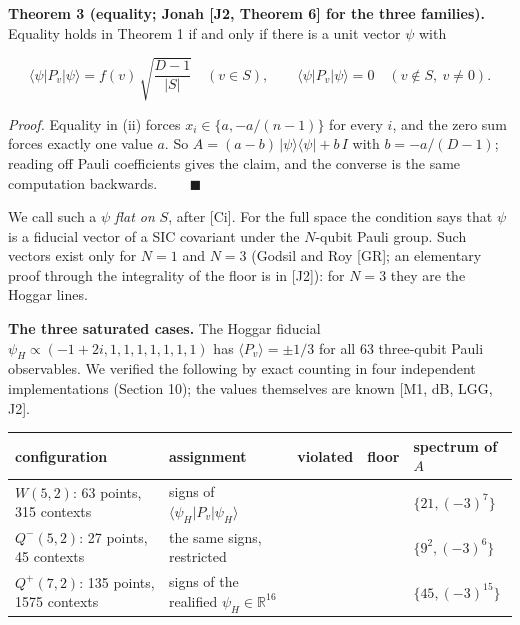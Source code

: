 \documentclass[11pt,a4paper]{article}
\begin{document}
\textbf{Theorem 3 (equality; Jonah {[}J2, Theorem 6{]} for the three families).} Equality holds in Theorem 1 if
and only if there is a unit vector \(\psi\) with

\[\langle \psi | P_v | \psi \rangle = f(v)\,\sqrt{\frac{D-1}{|S|}} \quad (v \in S), \qquad
\langle \psi | P_v | \psi \rangle = 0 \quad (v \notin S,\ v \ne 0).\]

\emph{Proof.} Equality in (ii) forces \(x_i \in \{a, -a/(n-1)\}\) for every \(i\), and the zero sum forces exactly
one value \(a\). So \(A = (a-b)\,|\psi\rangle\langle\psi| + b\,I\) with \(b = -a/(D-1)\); reading off Pauli
coefficients gives the claim, and the converse is the same computation backwards. \(\qquad\blacksquare\)

We call such a \(\psi\) \emph{flat on} \(S\), after {[}Ci{]}. For the full space the condition says that \(\psi\) is a
fiducial vector of a SIC covariant under the \(N\)-qubit Pauli group. Such vectors exist only for \(N = 1\)
and \(N = 3\) (Godsil and Roy {[}GR{]}; an elementary proof through the integrality of the floor is in {[}J2{]}):
for \(N = 3\) they are the Hoggar lines.

\textbf{The three saturated cases.} The Hoggar fiducial \(\psi_H \propto (-1+2i, 1, 1, 1, 1, 1, 1, 1)\) has
\(\langle P_v \rangle = \pm 1/3\) for all 63 three-qubit Pauli observables. We verified the following by
exact counting in four independent implementations (Section 10); the values themselves are known
{[}M1, dB, LGG, J2{]}.

{\def\LTcaptype{none} %
{\small
\begin{longtable}[]{@{}>{\raggedright\arraybackslash}p{}>{\raggedright\arraybackslash}p{}>{\raggedright\arraybackslash}p{}>{\raggedright\arraybackslash}p{}>{\raggedright\arraybackslash}p{}@{}}
\toprule\noalign{}
configuration & assignment & violated & floor & spectrum of \(A\) \\
\midrule\noalign{}
\endhead
\bottomrule\noalign{}
\endlastfoot
\(W(5,2)\): 63 points, 315 contexts & signs of \(\langle\psi_H\vert P_v\vert \psi_H\rangle\) & 63 & 63 & \(\{21, (-3)^7\}\) \\
\(Q^-(5,2)\): 27 points, 45 contexts & the same signs, restricted & 9 & 9 & \(\{9^2, (-3)^6\}\) \\
\(Q^+(7,2)\): 135 points, 1575 contexts & signs of the realified \(\psi_H \in \mathbb{R}^{16}\) & 315 & 315 & \(\{45, (-3)^{15}\}\) \\
\end{longtable}
}
}
\end{document}
